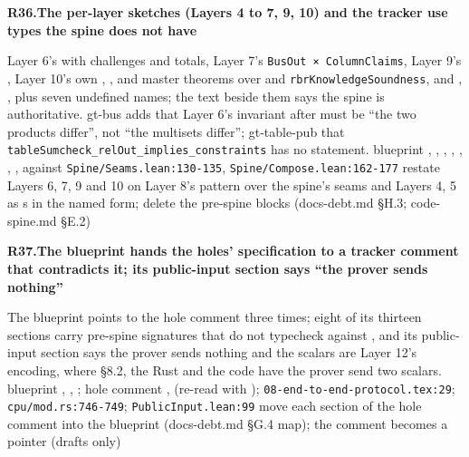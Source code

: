\par\medskip\noindent\textbf{R36.}\enspace\textbf{The per-layer sketches (Layers 4 to 7, 9, 10) and the tracker use types the spine does not have}\par\nopagebreak
{} Layer 6's  with challenges and totals, Layer 7's \texttt{Bus\allowbreak{}Out × Column\allowbreak{}Claims}, Layer 9's , Layer 10's own , ,  and master theorems over  and \texttt{rbr\allowbreak{}Knowledge\allowbreak{}Soundness}, and , ,  plus seven undefined names; the text beside them says the spine is authoritative. gt-bus adds that Layer 6's invariant after  must be ``the two products differ'', not ``the multisets differ''; gt-table-pub that \texttt{table\allowbreak{}Sumcheck\_\allowbreak{}rel\allowbreak{}Out\_\allowbreak{}implies\_\allowbreak{}constraints} has no statement.
 blueprint , , , , , , ,  against \texttt{Spine/\allowbreak{}Seams.\allowbreak{}lean:\allowbreak{}130-\allowbreak{}135}, \texttt{Spine/\allowbreak{}Compose.\allowbreak{}lean:\allowbreak{}162-\allowbreak{}177}
 restate Layers 6, 7, 9 and 10 on Layer 8's pattern over the spine's seams and Layers 4, 5 as s in the named form; delete the pre-spine blocks (docs-debt.md §H.3; code-spine.md §E.2)

\par\medskip\noindent\textbf{R37.}\enspace\textbf{The blueprint hands the holes' specification to a tracker comment that contradicts it; its public-input section says ``the prover sends nothing''}\par\nopagebreak
{} The blueprint points to the hole comment three times; eight of its thirteen sections carry pre-spine signatures that do not typecheck against , and its public-input section says the prover sends nothing and the scalars are Layer 12's encoding, where §8.2, the Rust and the code have the prover send two scalars.
 blueprint , , ; hole comment ,  (re-read with ); \texttt{08-\allowbreak{}end-\allowbreak{}to-\allowbreak{}end-\allowbreak{}protocol.\allowbreak{}tex:\allowbreak{}29}; \texttt{cpu/\allowbreak{}mod.\allowbreak{}rs:\allowbreak{}746-\allowbreak{}749}; \texttt{Public\allowbreak{}Input.\allowbreak{}lean:\allowbreak{}99}
 move each section of the hole comment into the blueprint (docs-debt.md §G.4 map); the comment becomes a pointer (drafts only)

